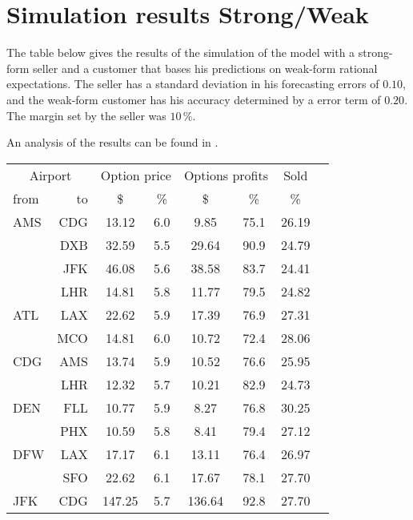 \chapter{Simulation results Strong/Weak}
\label{app:SimulationResultsStrongWeak}
The table below gives the results of the simulation of the model with a strong-form seller and a customer that bases his predictions on weak-form rational expectations. The seller has a standard deviation in his forecasting errors of $0.10$, and the weak-form customer has his accuracy determined by a error term of $0.20$. The margin set by the seller was $10\,\%$.

An analysis of the results can be found in .
\\[2em]
\begin{table}[h]
    \small
    \begin{center}
        \begin{tabular}{l r c c c c c c}
            \toprule
            \multicolumn{2}{c}{Airport}  & \multicolumn{2}{c}{Option price} & \multicolumn{2}{c}{Options profits}  &  Sold  \\[.4ex]
            from  &  to  &  \$  & \%  &  \$  & \%  & \%  \\
            \midrule
AMS  &  CDG &  13.12  &    6.0  &   9.85  &   75.1  &  26.19  \\
     &  DXB &  32.59  &    5.5  &  29.64  &   90.9  &  24.79  \\
     &  JFK &  46.08  &    5.6  &  38.58  &   83.7  &  24.41  \\
     &  LHR &  14.81  &    5.8  &  11.77  &   79.5  &  24.82  \\[.5ex]
ATL  &  LAX &  22.62  &    5.9  &  17.39  &   76.9  &  27.31  \\
     &  MCO &  14.81  &    6.0  &  10.72  &   72.4  &  28.06  \\[.5ex]
CDG  &  AMS &  13.74  &    5.9  &  10.52  &   76.6  &  25.95  \\
     &  LHR &  12.32  &    5.7  &  10.21  &   82.9  &  24.73  \\[.5ex]
DEN  &  FLL &  10.77  &    5.9  &   8.27  &   76.8  &  30.25  \\
     &  PHX &  10.59  &    5.8  &   8.41  &   79.4  &  27.12  \\[.5ex]
DFW  &  LAX &  17.17  &    6.1  &  13.11  &   76.4  &  26.97  \\
     &  SFO &  22.62  &    6.1  &  17.67  &   78.1  &  27.70  \\[.5ex]
JFK  &  CDG &  147.25  &    5.7  &  136.64  &   92.8  &  27.70  \\

\end{tabular}
\end{center}
\end{table}
